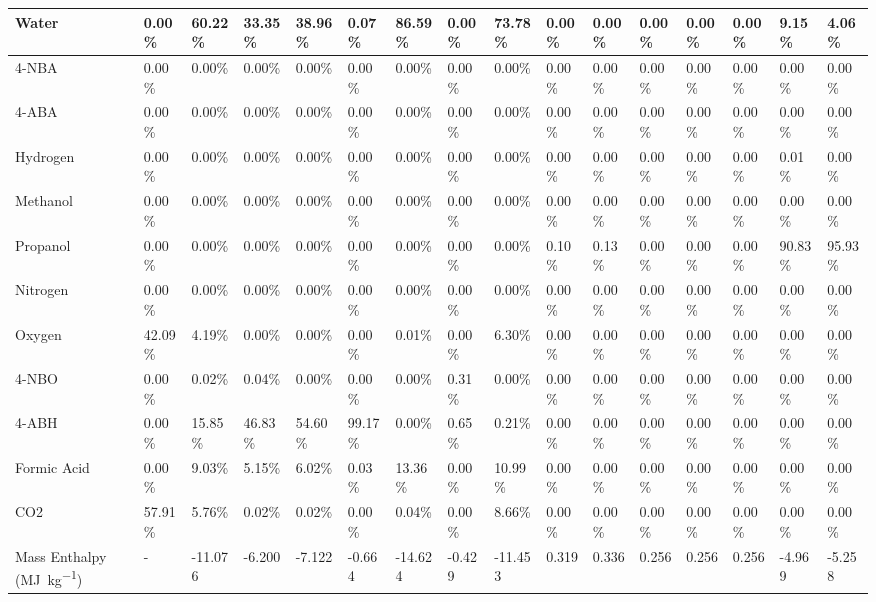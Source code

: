 \begin{landscape}
\begin{table}[H]
\begin{tabular}{|l|l|l|l|l|l|l|l|l|l|l|l|l|l|l|l|}
Water                   & 0.00\%  & 60.22\% & 33.35\% & 38.96\% & 0.07\%  & 86.59\% & 0.00\%  & 73.78\% & 0.00\%  & 0.00\%  & 0.00\%  & 0.00\%  & 0.00\%  & 9.15\%  & 4.06\%  \\ \hline
4-NBA                   & 0.00\%  & 0.00\%  & 0.00\%  & 0.00\%  & 0.00\%  & 0.00\%  & 0.00\%  & 0.00\%  & 0.00\%  & 0.00\%  & 0.00\%  & 0.00\%  & 0.00\%  & 0.00\%  & 0.00\%  \\ \hline
4-ABA                   & 0.00\%  & 0.00\%  & 0.00\%  & 0.00\%  & 0.00\%  & 0.00\%  & 0.00\%  & 0.00\%  & 0.00\%  & 0.00\%  & 0.00\%  & 0.00\%  & 0.00\%  & 0.00\%  & 0.00\%  \\ \hline
Hydrogen                & 0.00\%  & 0.00\%  & 0.00\%  & 0.00\%  & 0.00\%  & 0.00\%  & 0.00\%  & 0.00\%  & 0.00\%  & 0.00\%  & 0.00\%  & 0.00\%  & 0.00\%  & 0.01\%  & 0.00\%  \\ \hline
Methanol                & 0.00\%  & 0.00\%  & 0.00\%  & 0.00\%  & 0.00\%  & 0.00\%  & 0.00\%  & 0.00\%  & 0.00\%  & 0.00\%  & 0.00\%  & 0.00\%  & 0.00\%  & 0.00\%  & 0.00\%  \\ \hline
Propanol                & 0.00\%  & 0.00\%  & 0.00\%  & 0.00\%  & 0.00\%  & 0.00\%  & 0.00\%  & 0.00\%  & 0.10\%  & 0.13\%  & 0.00\%  & 0.00\%  & 0.00\%  & 90.83\% & 95.93\% \\ \hline
Nitrogen                & 0.00\%  & 0.00\%  & 0.00\%  & 0.00\%  & 0.00\%  & 0.00\%  & 0.00\%  & 0.00\%  & 0.00\%  & 0.00\%  & 0.00\%  & 0.00\%  & 0.00\%  & 0.00\%  & 0.00\%  \\ \hline
Oxygen                  & 42.09\% & 4.19\%  & 0.00\%  & 0.00\%  & 0.00\%  & 0.01\%  & 0.00\%  & 6.30\%  & 0.00\%  & 0.00\%  & 0.00\%  & 0.00\%  & 0.00\%  & 0.00\%  & 0.00\%  \\ \hline
4-NBO                   & 0.00\%  & 0.02\%  & 0.04\%  & 0.00\%  & 0.00\%  & 0.00\%  & 0.31\%  & 0.00\%  & 0.00\%  & 0.00\%  & 0.00\%  & 0.00\%  & 0.00\%  & 0.00\%  & 0.00\%  \\ \hline
4-ABH                   & 0.00\%  & 15.85\% & 46.83\% & 54.60\% & 99.17\% & 0.00\%  & 0.65\%  & 0.21\%  & 0.00\%  & 0.00\%  & 0.00\%  & 0.00\%  & 0.00\%  & 0.00\%  & 0.00\%  \\ \hline
Formic Acid             & 0.00\%  & 9.03\%  & 5.15\%  & 6.02\%  & 0.03\%  & 13.36\% & 0.00\%  & 10.99\% & 0.00\%  & 0.00\%  & 0.00\%  & 0.00\%  & 0.00\%  & 0.00\%  & 0.00\%  \\ \hline
CO2                     & 57.91\% & 5.76\%  & 0.02\%  & 0.02\%  & 0.00\%  & 0.04\%  & 0.00\%  & 8.66\%  & 0.00\%  & 0.00\%  & 0.00\%  & 0.00\%  & 0.00\%  & 0.00\%  & 0.00\%  \\ \hline
Mass Enthalpy (\si{\mega\J\per\kg})    & -       & -11.076 & -6.200  & -7.122  & -0.664  & -14.624 & -0.429  & -11.453 & 0.319   & 0.336   & 0.256   & 0.256   & 0.256   & -4.969  & -5.258  \\ \hline
\end{tabular}
\end{table}

\end{landscape}

